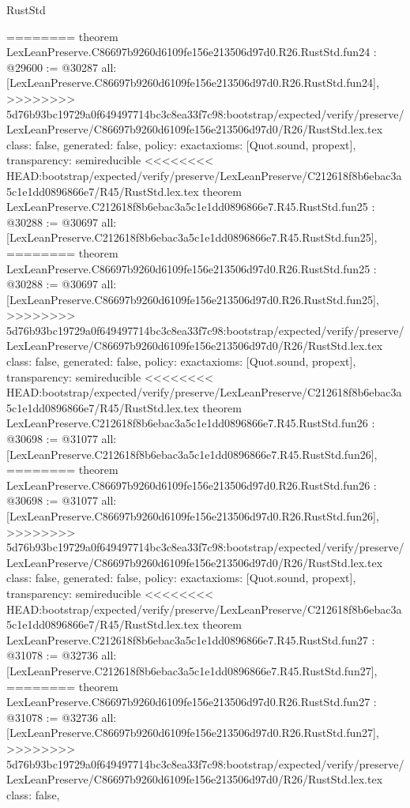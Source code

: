 \begin{lexlean}{RustStd}
\begin{coremodule}
{\begin{coremodule}
{{{{{{{{{{{{{{{{{{{{{{{{{{{========
theorem LexLeanPreserve.C86697b9260d6109fe156e213506d97d0.R26.RustStd.fun24 : @29600 := @30287 {
  all: [LexLeanPreserve.C86697b9260d6109fe156e213506d97d0.R26.RustStd.fun24],
>>>>>>>> 5d76b93bc19729a0f649497714bc3c8ea33f7c98:bootstrap/expected/verify/preserve/LexLeanPreserve/C86697b9260d6109fe156e213506d97d0/R26/RustStd.lex.tex
  class: false,
  generated: false,
  policy: exact{axioms: [Quot.sound, propext]},
  transparency: semireducible
}
<<<<<<<< HEAD:bootstrap/expected/verify/preserve/LexLeanPreserve/C212618f8b6ebac3a5c1e1dd0896866e7/R45/RustStd.lex.tex
theorem LexLeanPreserve.C212618f8b6ebac3a5c1e1dd0896866e7.R45.RustStd.fun25 : @30288 := @30697 {
  all: [LexLeanPreserve.C212618f8b6ebac3a5c1e1dd0896866e7.R45.RustStd.fun25],
========
theorem LexLeanPreserve.C86697b9260d6109fe156e213506d97d0.R26.RustStd.fun25 : @30288 := @30697 {
  all: [LexLeanPreserve.C86697b9260d6109fe156e213506d97d0.R26.RustStd.fun25],
>>>>>>>> 5d76b93bc19729a0f649497714bc3c8ea33f7c98:bootstrap/expected/verify/preserve/LexLeanPreserve/C86697b9260d6109fe156e213506d97d0/R26/RustStd.lex.tex
  class: false,
  generated: false,
  policy: exact{axioms: [Quot.sound, propext]},
  transparency: semireducible
}
<<<<<<<< HEAD:bootstrap/expected/verify/preserve/LexLeanPreserve/C212618f8b6ebac3a5c1e1dd0896866e7/R45/RustStd.lex.tex
theorem LexLeanPreserve.C212618f8b6ebac3a5c1e1dd0896866e7.R45.RustStd.fun26 : @30698 := @31077 {
  all: [LexLeanPreserve.C212618f8b6ebac3a5c1e1dd0896866e7.R45.RustStd.fun26],
========
theorem LexLeanPreserve.C86697b9260d6109fe156e213506d97d0.R26.RustStd.fun26 : @30698 := @31077 {
  all: [LexLeanPreserve.C86697b9260d6109fe156e213506d97d0.R26.RustStd.fun26],
>>>>>>>> 5d76b93bc19729a0f649497714bc3c8ea33f7c98:bootstrap/expected/verify/preserve/LexLeanPreserve/C86697b9260d6109fe156e213506d97d0/R26/RustStd.lex.tex
  class: false,
  generated: false,
  policy: exact{axioms: [Quot.sound, propext]},
  transparency: semireducible
}
<<<<<<<< HEAD:bootstrap/expected/verify/preserve/LexLeanPreserve/C212618f8b6ebac3a5c1e1dd0896866e7/R45/RustStd.lex.tex
theorem LexLeanPreserve.C212618f8b6ebac3a5c1e1dd0896866e7.R45.RustStd.fun27 : @31078 := @32736 {
  all: [LexLeanPreserve.C212618f8b6ebac3a5c1e1dd0896866e7.R45.RustStd.fun27],
========
theorem LexLeanPreserve.C86697b9260d6109fe156e213506d97d0.R26.RustStd.fun27 : @31078 := @32736 {
  all: [LexLeanPreserve.C86697b9260d6109fe156e213506d97d0.R26.RustStd.fun27],
>>>>>>>> 5d76b93bc19729a0f649497714bc3c8ea33f7c98:bootstrap/expected/verify/preserve/LexLeanPreserve/C86697b9260d6109fe156e213506d97d0/R26/RustStd.lex.tex
  class: false,
}}}}}}}}}}}}}}}}}}}}}}}}}}}}}}}
\end{coremodule}}
\end{coremodule}
\end{lexlean}

